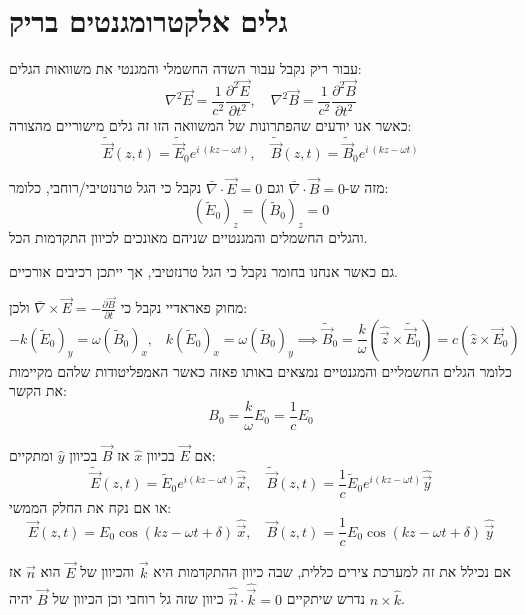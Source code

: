 \documentclass{tstextbook}
\begin{document}
\section{גלים אלקטרומגנטים בריק}

עבור ריק נקבל עבור השדה החשמלי והמגנטי את משוואות הגלים:
$$\nabla^{2}\vec{E}=\frac{1}{c^{2}}{\frac{\partial^{2}\vec{E}}{\partial t^{2}}},\quad\nabla^{2}\vec{B}=\frac{1}{c^{2}}{\frac{\partial^{2}\vec{B}}{\partial t^{2}}}$$
כאשר אנו יודעים שהפתרונות של המשוואה הזו זה גלים מישוריים מהצורה:
$$\tilde{\vec E}(z,t)=\tilde{\vec E}_{0}e^{i\,(k z-\omega t)},\quad\tilde{\vec B}(z,t)=\tilde{\vec B}_{0}e^{i\,(k z-\omega t)}$$

\begin{proposition}
מזה ש-\(\bar{\nabla} \cdot \vec{B}=0\) וגם \(\bar{\nabla} \cdot \vec{E}=0\) נקבל כי הגל טרנזטיבי/רוחבי, כלומר:
$$(\tilde{E}_{0})_{z}=(\tilde{B}_{0})_{z}=0$$
והגלים החשמלים והמגנטיים שניהם מאונכים לכיוון התקדמות הכל.

\end{proposition}
\begin{remark}
גם כאשר אנחנו בחומר נקבל כי הגל טרנזטיבי, אך ייתכן רכיבים אורכיים.

\end{remark}
\begin{proposition}
מחוק פאראדיי נקבל כי \(\bar{\nabla} \times \vec{E}=-\frac{\partial \vec{B}}{\partial t}\) ולכן:
$$-k\left( \tilde{E}_{0} \right)_{y}=\omega\left( \tilde{B}_{0} \right)_{x},\;\;\;k\left( \tilde{E}_{0} \right)_{x}=\omega\left( \tilde{B}_{0} \right)_{y}\implies \tilde{{\vec B}}_{0}=\frac{k}{\omega}\left( \hat{{\vec z}}\times\tilde{{\vec E}}_{0} \right)=c\left( \hat{z}\times \vec{E}_{0} \right)$$
כלומר הגלים החשמליים והמגנטיים נמצאים באותו פאזה כאשר האמפליטודות שלהם מקיימות את הקשר:
$$B_{0}=\frac{k}{\omega}E_{0}=\frac{1}{c}E_{0}$$

\end{proposition}
\begin{example}
אם \(\vec{E}\) בכיוון \(\hat{x}\) אז \(\vec{B}\) בכיוון \(\hat{y}\) ומתקיים:
$$\tilde{\vec E}(z,t)=\tilde{E}_{0}e^{i(k z-\omega t)}\hat{\vec x},\quad\tilde{\vec B}(z,t)=\frac1c\tilde{E}_{0}e^{i(k z-\omega t)}\hat{\vec y}$$
או אם נקח את החלק הממשי:
$$\vec{E}(z,t)=E_{0}\cos(k z-\omega t+\delta)\,{\hat{\vec{x}}},\quad\vec{B}(z,t)={\frac{1}{c}}E_{0}\cos(k z-\omega t+\delta)\,{\hat{\vec{y}}}$$

\end{example}
\begin{remark}
אם נכילל את זה למערכת צירים כללית, שבה כיוון ההתקדמות היא \(\vec{k}\) והכיוון של \(\vec{E}\) הוא \(\vec{n}\) אז נדרש שיתקיים \({\hat{\vec{n}}}\cdot{\hat{\vec{k}}}=0\) כיוון שזה גל רוחבי וכן הכיוון של \(\vec{B}\) יהיה \(\hat{n} \times \hat{k}\).

\end{remark}
\end{document}
